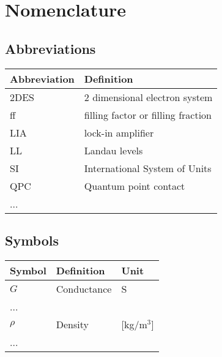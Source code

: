 \chapter*{Nomenclature}

\section*{Abbreviations}

\begin{longtable}{p{2.5cm}p{8cm}}
    \toprule
    Abbreviation & Definition \\
    \midrule\endhead %
    2DES    & 2 dimensional electron system \\
    ff      &    filling factor or filling fraction \\
    LIA     &   lock-in amplifier \\
    LL      &   Landau levels \\
    SI      &   International System of Units\\
    QPC     &   Quantum point contact \\
    ... \\
    \bottomrule
\end{longtable}

\section*{Symbols}

\begin{longtable}{p{2.5cm}p{8cm}p{2.5cm}}
    \toprule
    Symbol & Definition & Unit \\
    \midrule\endhead %
    $G$ & Conductance & S \\
    ... \\
    \midrule %
    $\rho$ & Density & [kg/m$^3$] \\
    ... \\
    \bottomrule
\end{longtable}
